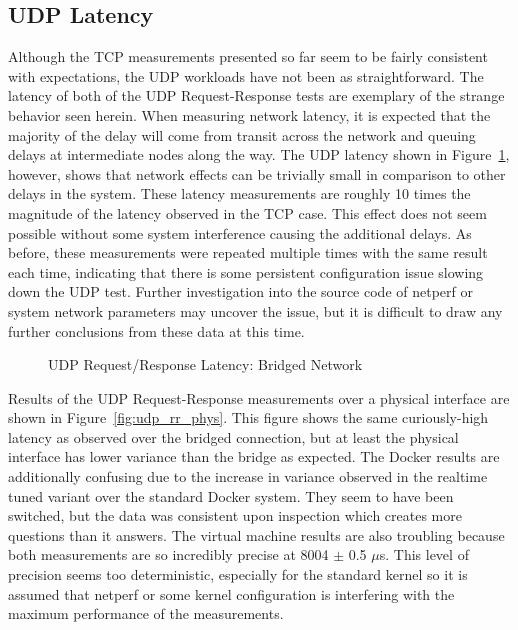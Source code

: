 \subsection{UDP Latency} %
\label{sub:udplatency}
Although the TCP measurements presented so far seem to be fairly consistent with expectations, the UDP workloads have not been as straightforward.
The latency of both of the UDP Request-Response tests are exemplary of the strange behavior seen herein.
When measuring network latency, it is expected that the majority of the delay will come from transit across the network and queuing delays at intermediate nodes along the way.  
The UDP latency shown in Figure~\ref{fig:udp_rr_bridge}, however, shows that network effects can be trivially small in comparison to other delays in the system.
These latency measurements are roughly 10 times the magnitude of the latency observed in the TCP case.
This effect does not seem possible without some system interference causing the additional delays.  
As before, these measurements were repeated multiple times with the same result each time, indicating that there is some persistent configuration issue slowing down the UDP test.
Further investigation into the source code of netperf or system network parameters may uncover the issue, but it is difficult to draw any further conclusions from these data at this time.

\begin{figure}
    \centering
    \def\svgwidth{\columnwidth}
    
    \caption{UDP Request/Response Latency: Bridged Network}
    \label{fig:udp_rr_bridge}
\end{figure}
Results of the UDP Request-Response measurements over a physical interface are shown in Figure~\ref{fig:udp_rr_phys}.  
This figure shows the same curiously-high latency as observed over the bridged connection, but at least the physical interface has lower variance than the bridge as expected.
The Docker results are additionally confusing due to the increase in variance observed in the realtime tuned variant over the standard Docker system.
They seem to have been switched, but the data was consistent upon inspection which creates more questions than it answers.
The virtual machine results are also troubling because both measurements are so incredibly precise at 8004 $\pm$ 0.5 $\mu$s.  
This level of precision seems too deterministic, especially for the standard kernel so it is assumed that netperf or some kernel configuration is interfering with the maximum performance of the measurements.

